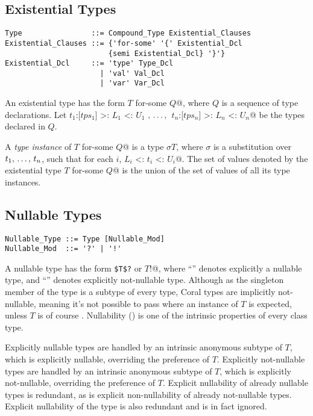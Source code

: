 \subsection{Existential Types}
\label{sec:existential-types}

\syntax\begin{lstlisting}[escapechar=@]
Type                ::= Compound_Type Existential_Clauses
Existential_Clauses ::= {'for-some' '{' Existential_Dcl
                        {semi Existential_Dcl} '}'}
Existential_Dcl     ::= 'type' Type_Dcl
                      | 'val' Val_Dcl
                      | 'var' Var_Dcl
\end{lstlisting}

An existential type has the form \lstinline@$T$ for-some {$Q$}@, where $Q$ is a sequence of type declarations. Let \lstinline@$t_1$:[$tps_1$] >: $L_1$ <: $U_1$ $,\, \ldots ,\,$ $t_n$:[$tps_n$] >: $L_n$ <: $U_n$@ be the types declared in $Q$. 

A {\em type instance} of \lstinline@$T$ for-some {$Q$}@ is a type $\sigma T$, where $\sigma$ is a substitution over $t_1 ,\, \ldots ,\, t_n$, such that for each $i$, \lstinline@$L_i$ <: $t_i$ <: $U_i$@. The set of values denoted by the existential type \lstinline@$T$ for-some {$Q$}@ is the union of the set of values of all its type instances. 






\subsection{Nullable Types}
\label{sec:nullable-types}

\syntax\begin{lstlisting}
Nullable_Type ::= Type [Nullable_Mod]
Nullable_Mod  ::= '?' | '!'
\end{lstlisting}

A nullable type has the form \lstinline!$T$?! or \lstinline@$T$!@, where ``'' denotes explicitly a nullable type, and ``\code{!}'' denotes explicitly not-nullable type. Although  as the singleton member of the  type is a subtype of every type, Coral types are implicitly not-nullable, meaning it's not possible to pass  where an instance of $T$ is expected, unless $T$ is of course . Nullability () is one of the intrinsic properties of every class type. 

Explicitly nullable types are handled by an intrinsic anonymous subtype of $T$, which is explicitly nullable, overriding the preference of $T$. Explicitly not-nullable types are handled by an intrinsic anonymous subtype of $T$, which is explicitly not-nullable, overriding the preference of $T$. Explicit nullability of already nullable types is redundant, as is explicit non-nullability of already not-nullable types. Explicit nullability of the  type is also redundant and is in fact ignored. 

